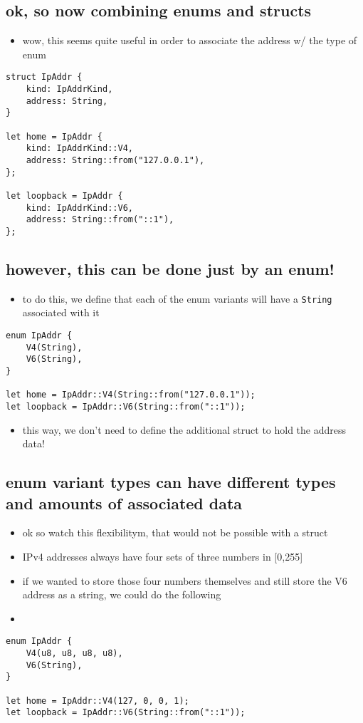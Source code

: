 \documentclass[11pt]{article}
\begin{document}
\subsection{ok, so now combining enums and structs}
\label{sec:orgec4ef8e}
\begin{itemize}
\item wow, this seems quite useful in order to associate the address w/ the type of enum
\end{itemize}
\begin{verbatim}
struct IpAddr {
    kind: IpAddrKind,
    address: String,
}

let home = IpAddr {
    kind: IpAddrKind::V4,
    address: String::from("127.0.0.1"),
};

let loopback = IpAddr {
    kind: IpAddrKind::V6,
    address: String::from("::1"),
};

\end{verbatim}

\subsection{however, this can be done just by an enum!}
\label{sec:org69d68e1}
\begin{itemize}
\item to do this, we define that each of the enum variants will have a \texttt{String} associated with it
\end{itemize}
\begin{verbatim}
enum IpAddr {
    V4(String),
    V6(String),
}

let home = IpAddr::V4(String::from("127.0.0.1"));
let loopback = IpAddr::V6(String::from("::1"));
\end{verbatim}
\begin{itemize}
\item this way, we don't need to define the additional struct to hold the address data!
\end{itemize}



\subsection{enum variant types can have different types and amounts of associated data}
\label{sec:orgd973af4}
\begin{itemize}
\item ok so watch this flexibilitym, that would not be possible with a struct
\item IPv4 addresses always have four sets of three numbers in [0,255]
\item if we wanted to store those four numbers themselves and still store the V6 address as a string, we could do the following
\item 
\end{itemize}
\begin{verbatim}
enum IpAddr {
    V4(u8, u8, u8, u8),
    V6(String),
}

let home = IpAddr::V4(127, 0, 0, 1);
let loopback = IpAddr::V6(String::from("::1"));
\end{verbatim}
\end{document}
